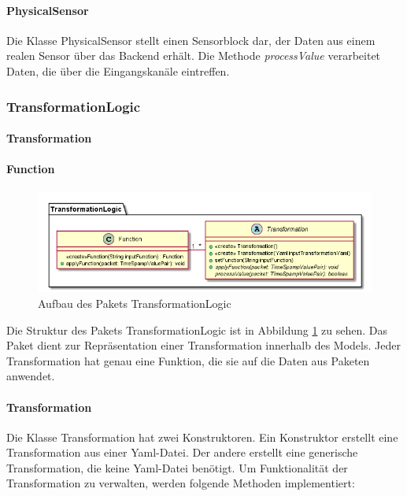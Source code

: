 \documentclass[parskip=full]{scrartcl}
\begin{document}
\paragraph{PhysicalSensor}
Die Klasse PhysicalSensor stellt einen Sensorblock dar, der Daten aus einem realen Sensor über das Backend erhält.  Die Methode \textit{processValue} verarbeitet Daten, die über die Eingangskanäle eintreffen.

\subsubsection{TransformationLogic}
\paragraph{Transformation}
\paragraph{Function}
\begin{figure}[htbp]
	\begin{center}
		\includegraphics[width = 12cm]{Grafiken/TransformationLogic.png}
		\caption{Aufbau des Pakets TransformationLogic}
		\label{TransformationLogic}
	\end{center}
\end{figure}

Die Struktur des Pakets TransformationLogic ist in Abbildung \ref{TransformationLogic} zu sehen. Das Paket dient zur Repräsentation einer Transformation innerhalb des Models. Jeder Transformation hat genau eine Funktion, die sie auf die Daten aus Paketen anwendet.


\paragraph{Transformation}

Die Klasse Transformation hat zwei Konstruktoren. Ein Konstruktor erstellt eine Transformation aus einer Yaml-Datei. Der andere erstellt eine generische Transformation, die keine Yaml-Datei benötigt. Um Funktionalität der Transformation zu verwalten, werden folgende Methoden implementiert:
\end{document}
